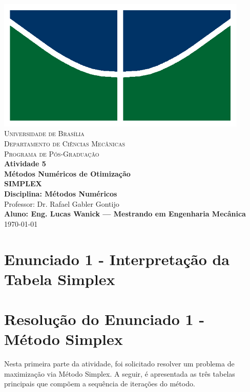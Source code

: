 \documentclass[12pt]{article}
\begin{document}
\begin{titlepage}
    \centering
    \includegraphics[width=12cm]{img/unb_bandeira.png} \\
    \vspace{1cm}
    \textsc{\Large Universidade de Bras\'ilia} \\
    \textsc{Departamento de Ciências Mec\^anicas} \\
    \textsc{Programa de P\'os-Gradua\c{c}\~ao} \\
    \vfill
    {\Large\bfseries Atividade 5} \\
    \vspace{0.5cm}
    {\Large\bfseries Métodos Numéricos de Otimização} \\
    {\Large\bfseries SIMPLEX} \\
    \vspace{0.5cm}
    \textbf{Disciplina: M\'etodos Num\'ericos} \\
    Professor: Dr. Rafael Gabler Gontijo \\
    \vfill
    \textbf{Aluno: Eng. Lucas Wanick — Mestrando em Engenharia Mec\^anica} \\
    \vspace{0.5cm}
        \today \\
\end{titlepage}

\section*{Enunciado 1 - Interpretação da Tabela Simplex}

\section*{Resolução do Enunciado 1 - Método Simplex}

Nesta primeira parte da atividade, foi solicitado resolver um problema de maximização via Método Simplex. A seguir, é apresentada as três tabelas principais que compõem a sequência de iterações do método.
\end{document}
